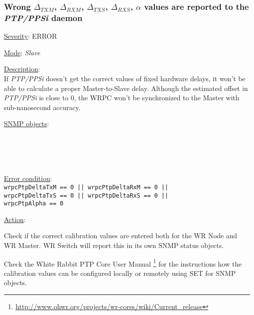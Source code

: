 \subsubsection{\bf Wrong $\Delta_{TXM}$, $\Delta_{RXM}$, $\Delta_{TXS}$,
		$\Delta_{RXS}$, $\alpha$ values are reported to the \emph{PTP/PPSi} daemon}
		\label{fail:timing:deltas_report}
		\begin{pck_descr}
			\item [] \underline{Severity}: ERROR
			\item [] \underline{Mode}: \emph{Slave}
			\item [] \underline{Description}:\\
				If \emph{PTP/PPSi} doesn't get the correct values of fixed hardware delays,
				it won't be able to calculate a proper Master-to-Slave delay. Although
				the estimated offset in \emph{PTP/PPSi} is close to 0, the WRPC won't be
				synchronized to the Master with sub-nanosecond accuracy.
			\item [] \underline{SNMP objects}:\\
				{\footnotesize
				\\
				\\
				\\
				\\
				 }
			\item [] \underline{Error condition}:\\
				{\footnotesize
				\texttt{wrpcPtpDeltaTxM == 0 || wrpcPtpDeltaRxM == 0 ||}\\
				\texttt{wrpcPtpDeltaTxS == 0 || wrpcPtpDeltaRxS == 0 ||}\\
				\texttt{wrpcPtpAlpha == 0} }
      \item [] \underline{Action}:
        \begin{pck_proc}
        \item Check if the correct calibration values are entered both for the WR
          Node and WR Master. WR Switch will report this in its own SNMP status
          objects.
        \item Check the White Rabbit PTP Core User Manual
          \footnote{\url{http://www.ohwr.org/projects/wr-cores/wiki/Current\_release}}
          for the instructions how the calibration values can be configured
          locally or remotely using SET for SNMP objects.
        \end{pck_proc}
		\end{pck_descr}

